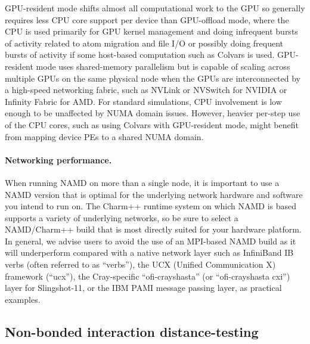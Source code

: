 GPU-resident mode shifts almost all computational work to the GPU
so generally requires less CPU core support per device than GPU-offload mode,
where the CPU is used primarily for GPU kernel management
and doing infrequent bursts of activity related to atom migration and file I/O
or possibly doing frequent bursts of activity if some host-based
computation such as Colvars is used.
GPU-resident mode uses shared-memory parallelism
but is capable of scaling across multiple GPUs on the same physical node
when the GPUs are interconnected by a high-speed networking fabric,
such as NVLink or NVSwitch for NVIDIA or Infinity Fabric for AMD.
For standard simulations, CPU involvement is low enough
to be unaffected by NUMA domain issues.
However, heavier per-step use of the CPU cores,
such as using Colvars with GPU-resident mode,
might benefit from mapping device PEs to a shared NUMA domain.


\paragraph{Networking performance.}
When running NAMD on more than a single node, it is important to 
use a NAMD version that is optimal for the underlying network hardware
and software you intend to run on.  The Charm++ runtime system on which
NAMD is based supports a variety of underlying networks, so be sure to
select a NAMD/Charm++ build that is most directly suited for your 
hardware platform.  In general, we advise users to avoid the use of 
an MPI-based NAMD build as it will underperform compared with a native
network layer such as InfiniBand IB verbs (often referred to as ``verbs''),
the UCX (Unified Communication X) framework (``ucx''),
the Cray-specific ``ofi-crayshasta'' (or ``ofi-crayshasta cxi'') layer
for Slingshot-11,
or the IBM PAMI message passing layer, as practical examples.


\subsection{Non-bonded interaction distance-testing}

